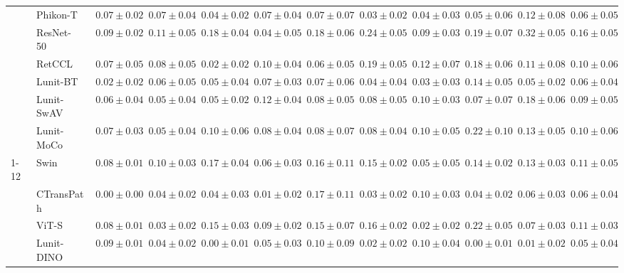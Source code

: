 \begin{tabular}{ll|cccc|c|cccc|c}
 & Phikon-T~\cite{filiot2023scaling} & $0.07 \pm 0.02$ & $0.07 \pm 0.04$ & $0.04 \pm 0.02$ & $0.07 \pm 0.04$ & $0.07 \pm 0.07$ & $0.03 \pm 0.02$ & $0.04 \pm 0.03$ & $0.05 \pm 0.06$ & $0.12 \pm 0.08$ & $0.06 \pm 0.05$ \\
 & ResNet-50~\cite{he2015deep} & $0.09 \pm 0.02$ & $0.11 \pm 0.05$ & $0.18 \pm 0.04$ & $0.04 \pm 0.05$ & $0.18 \pm 0.06$ & $0.24 \pm 0.05$ & $0.09 \pm 0.03$ & $0.19 \pm 0.07$ & $0.32 \pm 0.05$ & $0.16 \pm 0.05$ \\
 & RetCCL~\cite{wang2023retccl} & $0.07 \pm 0.05$ & $0.08 \pm 0.05$ & $\mathbf{0.02 \pm 0.02}$ & $0.10 \pm 0.04$ & $0.06 \pm 0.05$ & $0.19 \pm 0.05$ & $0.12 \pm 0.07$ & $0.18 \pm 0.06$ & $0.11 \pm 0.08$ & $0.10 \pm 0.06$ \\
 & Lunit-BT~\cite{kang2023benchmarking} & $0.02 \pm 0.02$ & $0.06 \pm 0.05$ & $0.05 \pm 0.04$ & $0.07 \pm 0.03$ & $0.07 \pm 0.06$ & $0.04 \pm 0.04$ & $\mathbf{0.03 \pm 0.03}$ & $0.14 \pm 0.05$ & $0.05 \pm 0.02$ & $0.06 \pm 0.04$ \\
 & Lunit-SwAV~\cite{kang2023benchmarking} & $0.06 \pm 0.04$ & $0.05 \pm 0.04$ & $0.05 \pm 0.02$ & $0.12 \pm 0.04$ & $0.08 \pm 0.05$ & $0.08 \pm 0.05$ & $0.10 \pm 0.03$ & $0.07 \pm 0.07$ & $0.18 \pm 0.06$ & $0.09 \pm 0.05$ \\
 & Lunit-MoCo~\cite{kang2023benchmarking} & $0.07 \pm 0.03$ & $0.05 \pm 0.04$ & $0.10 \pm 0.06$ & $0.08 \pm 0.04$ & $0.08 \pm 0.07$ & $0.08 \pm 0.04$ & $0.10 \pm 0.05$ & $0.22 \pm 0.10$ & $0.13 \pm 0.05$ & $0.10 \pm 0.06$ \\
\cline{1-12}
\multirow[t]{12}{*}{Mean pool} & Swin~\cite{liu2021swin} & $0.08 \pm 0.01$ & $0.10 \pm 0.03$ & $0.17 \pm 0.04$ & $0.06 \pm 0.03$ & $0.16 \pm 0.11$ & $0.15 \pm 0.02$ & $0.05 \pm 0.05$ & $0.14 \pm 0.02$ & $0.13 \pm 0.03$ & $0.11 \pm 0.05$ \\
 & CTransPath~\cite{wang2022transformer} & $\mathbf{0.00 \pm 0.00}$ & $0.04 \pm 0.02$ & $0.04 \pm 0.03$ & $\mathbf{0.01 \pm 0.02}$ & $0.17 \pm 0.11$ & $0.03 \pm 0.02$ & $0.10 \pm 0.03$ & $0.04 \pm 0.02$ & $0.06 \pm 0.03$ & $0.06 \pm 0.04$ \\
 & ViT-S~\cite{kolesnikov2021image} & $0.08 \pm 0.01$ & $0.03 \pm 0.02$ & $0.15 \pm 0.03$ & $0.09 \pm 0.02$ & $0.15 \pm 0.07$ & $0.16 \pm 0.02$ & $\mathbf{0.02 \pm 0.02}$ & $0.22 \pm 0.05$ & $0.07 \pm 0.03$ & $0.11 \pm 0.03$ \\
 & Lunit-DINO~\cite{kang2023benchmarking} & $0.09 \pm 0.01$ & $0.04 \pm 0.02$ & $\mathbf{0.00 \pm 0.01}$ & $0.05 \pm 0.03$ & $\mathbf{0.10 \pm 0.09}$ & $0.02 \pm 0.02$ & $0.10 \pm 0.04$ & $\mathbf{0.00 \pm 0.01}$ & $0.01 \pm 0.02$ & $\mathbf{0.05 \pm 0.04}$ \\

\end{tabular}
